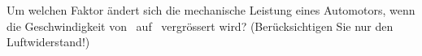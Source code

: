 Um welchen Faktor ändert sich die mechanische Leistung eines Automotors, wenn die Geschwindigkeit von \vlaO\ auf \vlbO\ vergrössert wird? (Berücksichtigen Sie nur den Luftwiderstand!)
